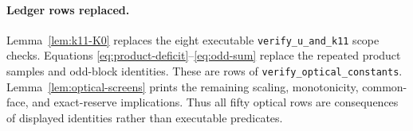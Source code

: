 \documentclass[11pt]{article}
\begin{document}
\paragraph{Ledger rows replaced.}
Lemma~\ref{lem:k11-K0} replaces the eight executable
\texttt{verify\_u\_and\_k11} scope checks. Equations
\eqref{eq:product-deficit}--\eqref{eq:odd-sum} replace the repeated
product samples and odd-block identities. These are rows of
\texttt{verify\_optical\_constants}.
Lemma~\ref{lem:optical-screens}
prints the remaining scaling, monotonicity, common-face, and exact-reserve
implications. Thus all fifty optical rows are consequences of displayed
identities rather than executable predicates.
\end{document}
